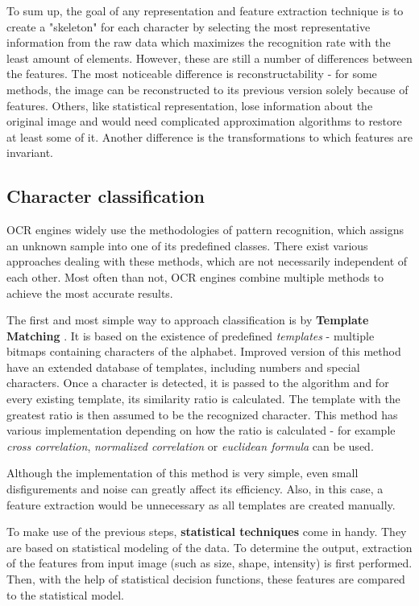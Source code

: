 To sum up, the goal of any representation and feature extraction technique is to create a "skeleton" for each character by selecting the most representative information from the raw data which maximizes the recognition rate with the least amount of elements. However, these are still a number of differences between the features. The most noticeable difference is reconstructability - for some methods, the image can be reconstructed to its previous version solely because of features. Others, like statistical representation, lose information about the original image and would need complicated approximation algorithms to restore at least some of it. Another difference is the transformations to which features are invariant.

\subsection{Character classification}

OCR engines widely use the methodologies of pattern recognition, which assigns an unknown sample into one of its predefined classes. There exist various approaches dealing with these methods, which are not necessarily independent of each other. Most often than not, OCR engines combine multiple methods to achieve the most accurate results.

The first and most simple way to approach classification is by \textbf{Template Matching} \citep{templateMatching}. It is based on the existence of predefined \emph{templates} - multiple bitmaps containing characters of the alphabet. Improved version of this method have an extended database of templates, including numbers and special characters. Once a character is detected, it is passed to the algorithm and for every existing template, its similarity ratio is calculated. The template with the greatest ratio is then assumed to be the recognized character. This method has various implementation depending on how the ratio is calculated - for example \emph{cross correlation}, \emph{normalized correlation} or \emph{euclidean formula} can be used.

Although the implementation of this method is very simple, even small disfigurements and noise can greatly affect its efficiency. Also, in this case, a feature extraction would be unnecessary as all templates are created manually.

To make use of the previous steps, \textbf{statistical techniques} \citep{characterClassification} come in handy. They are based on statistical modeling of the data. To determine the output, extraction of the features from input image (such as size, shape, intensity) is first performed. Then, with the help of statistical decision functions, these features are compared to the statistical model.

